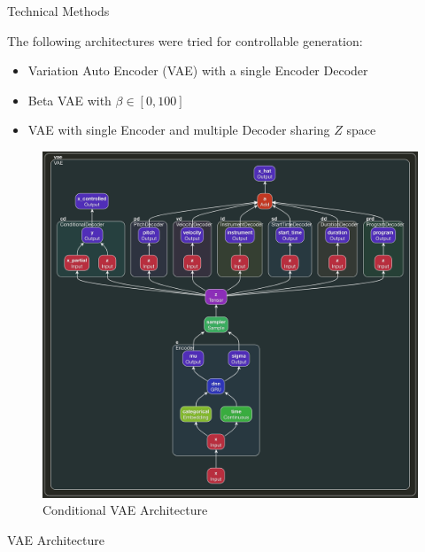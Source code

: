 \documentclass[final]{beamer}
\newlength{\onecolwid}
\newlength{\twocolwid}
\begin{document}
\begin{frame}[t]
\begin{columns}[t]
\begin{column}{\twocolwid}
\begin{columns}[t,totalwidth=\twocolwid]
\begin{column}{\onecolwid}



\begin{block}{Technical Methods}

The following architectures were tried for controllable generation:

\begin{itemize}
\item Variation Auto Encoder (VAE) with a single Encoder Decoder
\item Beta VAE with $\beta \in [0, 100]$
\item VAE with single Encoder and multiple Decoder sharing $Z$ space
\end{itemize}

\begin{figure}
\includegraphics[width=1.0\linewidth]{midi_vae.png}
\caption{Conditional VAE Architecture}
\end{figure}

\end{block}


\begin{block}{VAE Architecture}


\end{block}
\end{column}
\end{columns}
\end{column}
\end{columns}
\end{frame}
\end{document}
